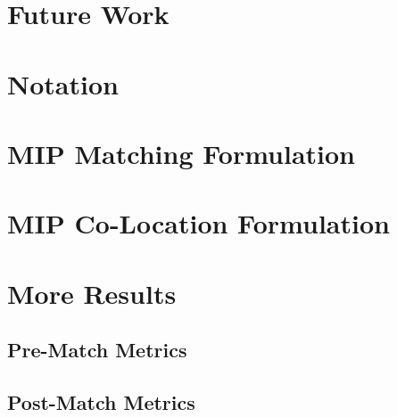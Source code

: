 \documentclass{article}
\begin{document}


\section{Future Work}



\nocite{*}



\newpage

\appendix
\appendixpage
\addappheadtotoc

\section{Notation}



\newpage

\section{MIP Matching Formulation}
\label{Matching}



\newpage 

\section{MIP Co-Location Formulation}
\label{CoLocation}



\section{More Results}

\subsection{Pre-Match Metrics}


\subsection{Post-Match Metrics}
\end{document}
